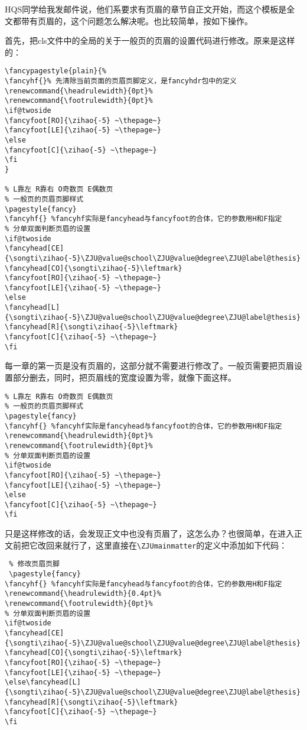 HQS同学给我发邮件说，他们系要求有页眉的章节自正文开始，而这个模板是全文都带有页眉的，这个问题怎么解决呢。也比较简单，按如下操作。

首先，把cls文件中的全局的关于一般页的页眉的设置代码进行修改。原来是这样的：

{
\begin{verbatim}
\fancypagestyle{plain}{%
\fancyhf{}% 先清除当前页面的页眉页脚定义，是fancyhdr包中的定义
\renewcommand{\headrulewidth}{0pt}%
\renewcommand{\footrulewidth}{0pt}%
\if@twoside
\fancyfoot[RO]{\zihao{-5} ~\thepage~}
\fancyfoot[LE]{\zihao{-5} ~\thepage~}
\else
\fancyfoot[C]{\zihao{-5} ~\thepage~}
\fi
}

% L靠左 R靠右 O奇数页 E偶数页
% 一般页的页眉页脚样式
\pagestyle{fancy}
\fancyhf{} %fancyhf实际是fancyhead与fancyfoot的合体，它的参数用H和F指定
% 分单双面判断页眉的设置
\if@twoside
\fancyhead[CE]{\songti\zihao{-5}\ZJU@value@school\ZJU@value@degree\ZJU@label@thesis}
\fancyhead[CO]{\songti\zihao{-5}\leftmark}
\fancyfoot[RO]{\zihao{-5} ~\thepage~}
\fancyfoot[LE]{\zihao{-5} ~\thepage~}
\else
\fancyhead[L]{\songti\zihao{-5}\ZJU@value@school\ZJU@value@degree\ZJU@label@thesis}
\fancyhead[R]{\songti\zihao{-5}\leftmark}
\fancyfoot[C]{\zihao{-5} ~\thepage~}
\fi
\end{verbatim}
}

每一章的第一页是没有页眉的，这部分就不需要进行修改了。一般页需要把页眉设置部分删去，同时，把页眉线的宽度设置为零，就像下面这样。

{
\begin{verbatim}
% L靠左 R靠右 O奇数页 E偶数页
% 一般页的页眉页脚样式
\pagestyle{fancy}
\fancyhf{} %fancyhf实际是fancyhead与fancyfoot的合体，它的参数用H和F指定
\renewcommand{\headrulewidth}{0pt}%
\renewcommand{\footrulewidth}{0pt}%
% 分单双面判断页眉的设置
\if@twoside
\fancyfoot[RO]{\zihao{-5} ~\thepage~}
\fancyfoot[LE]{\zihao{-5} ~\thepage~}
\else
\fancyfoot[C]{\zihao{-5} ~\thepage~}
\fi
\end{verbatim}
}

只是这样修改的话，会发现正文中也没有页眉了，这怎么办？也很简单，在进入正文前把它改回来就行了，这里直接在\verb+\ZJUmainmatter+的定义中添加如下代码：

{
\begin{verbatim}
 % 修改页眉页脚
 \pagestyle{fancy}
\fancyhf{} %fancyhf实际是fancyhead与fancyfoot的合体，它的参数用H和F指定
\renewcommand{\headrulewidth}{0.4pt}%
\renewcommand{\footrulewidth}{0pt}%
% 分单双面判断页眉的设置
\if@twoside
\fancyhead[CE]{\songti\zihao{-5}\ZJU@value@school\ZJU@value@degree\ZJU@label@thesis}
\fancyhead[CO]{\songti\zihao{-5}\leftmark}
\fancyfoot[RO]{\zihao{-5} ~\thepage~}
\fancyfoot[LE]{\zihao{-5} ~\thepage~}
\else\fancyhead[L]{\songti\zihao{-5}\ZJU@value@school\ZJU@value@degree\ZJU@label@thesis}
\fancyhead[R]{\songti\zihao{-5}\leftmark}
\fancyfoot[C]{\zihao{-5} ~\thepage~}
\fi
\end{verbatim}
}

